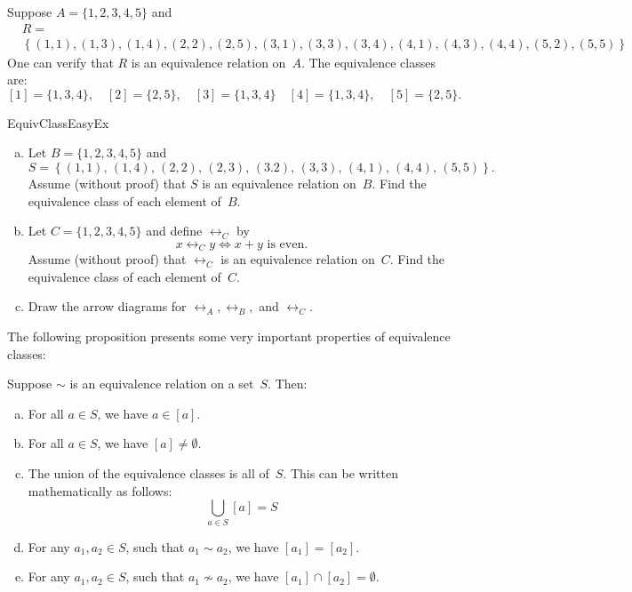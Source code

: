 \begin{eg} \label{EquivClassEg}
Suppose $A = \{1,2,3,4,5\}$ and 
\begin{align*}
&R = \\
&\left\{  (1,1), (1,3), (1,4), (2,2), (2,5), (3,1), (3,3), 
		(3,4), (4,1), (4,3), (4,4), (5,2), (5,5) 
\right\}
\end{align*}
One can verify that $R$ is an equivalence relation on~$A$. The equivalence classes are:
$$ [1] = \{1,3,4\},
\quad [2] = \{2,5\} ,
\quad [3] = \{1,3,4\} 
\quad[4] = \{1,3,4\} ,
\quad [5] = \{2,5\} .$$
\end{eg}


\begin{exercise}{EquivClassEasyEx}
\begin{enumerate}[(a)]
\item \label{EquivClassEasyEx-set}
Let $B = \{1,2,3,4,5\}$ and 
	$$S = \left\{ (1,1),\, (1,4),\, (2,2),\, (2,3),\, (3.2),\, 
		(3,3),\, (4,1),\, (4,4),\, (5,5)
		 \right\} .$$
Assume (without proof) that $S$ is an equivalence relation on~$B$. Find the equivalence class of each element of~$B$.


\item \label{EquivClassEasyEx-x+y}
Let $C = \{1,2,3,4,5\}$ and define $\rel_C$ by 
\[ x \rel_C y \iff x + y \text{ is even.} \]
Assume (without proof) that $\rel_C$ is an equivalence relation on~$C$. Find the equivalence class of each element of~$C$.
\item
Draw the arrow diagrams for $\rel_A, \rel_B,$ and $\rel_C$.
\end{enumerate}
\end{exercise}


The following proposition presents some very important properties of equivalence classes:

\begin{thm} \label{EquivRelProps}
Suppose $\sim$ is an equivalence relation on a set~$S$. Then:
\begin{enumerate}[(a)]
\item \label{EquivRelProps-aIn[a]}
 For all $a \in S$, we have $a \in [a]$.
\item \label{EquivRelProps-nonempty}
 For all $a \in S$, we have $[a] \neq \emptyset$.
\item \label{EquivRelProps-union}
 The union of the equivalence classes is all of~$S$. This can be written mathematically as follows:
	$$ \bigcup_{a \in S} [a] = S$$
\item \label{EquivRelProps-equal}
 For any $a_1,a_2 \in S$, such that $a_1 \sim a_2$, we have $[a_1] = [a_2]$.
\item \label{EquivRelProps-disjoint}
 For any $a_1,a_2 \in S$, such that $a_1 \not\sim a_2$, we have $[a_1] \cap [a_2] = \emptyset$.
\end{enumerate}
\end{thm}

